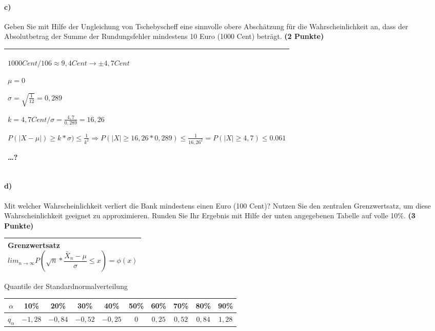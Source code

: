 \documentclass[10pt, a4paper]{article}
\begin{document}
\paragraph{c)} Geben Sie mit Hilfe der Ungleichung von Tschebyscheff eine sinnvolle obere Abschätzung für die Wahrscheinlichkeit an, dass der Absolutbetrag der Summe der Rundungsfehler mindestens 10 Euro (1000 Cent) beträgt. \textbf{(2 Punkte)}\\
\begin{tabular}{| p{17cm} |}
    \hline
    $1000 Cent / 106 \approx 9,4 Cent \rightarrow \pm 4,7 Cent$

    $\mu= 0$

    $\sigma= \sqrt{\frac{1}{12}} = 0,289$

    $k = 4,7 Cent / \sigma = \frac{4,7}{0,289} = 16,26$

    $P(|X-\mu|)\geq k*\sigma) \leq \frac{1}{k^2} \Rightarrow P(|X|\geq 16,26*0,289)\leq \frac{1}{16,26^2} = P(|X|\geq 4,7) \leq 0.061$

    \dots ?
    \\\hline
\end{tabular}

\paragraph{d)} Mit welcher Wahrscheinlichkeit verliert die Bank mindestens einen Euro (100 Cent)? Nutzen Sie den zentralen Grenzwertsatz, um diese Wahrscheinlichkeit geeignet zu approximieren. Runden Sie Ihr Ergebnis mit Hilfe der unten angegebenen Tabelle auf volle 10\%. \textbf{(3 Punkte)}\\
\begin{tabular}{| p{17cm} |}
    \hline
    Grenzwertsatz $$lim_{n\rightarrow \infty} P(\sqrt{n} * \frac{\bar{X}_n -\mu}{\sigma}\leq x)=\phi (x)$$

    \\\hline
\end{tabular}

Quantile der Standardnormalverteilung\\
\begin{center}
    \begin{tabular}{c | c | c | c | c | c | c | c | c | c}
        $\alpha$     & 10\%    & 20\%    & 30\%    & 40\%    & 50\% & 60\%   & 70\%   & 80\%   & 90\%   \\\hline
        $q_{\alpha}$ & $-1,28$ & $-0,84$ & $-0,52$ & $-0,25$ & $0$  & $0,25$ & $0,52$ & $0,84$ & $1,28$
    \end{tabular}
\end{center}
\end{document}
